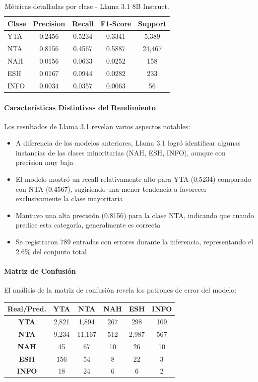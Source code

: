 \begin{table}[H]
\centering
\caption{Métricas detalladas por clase - Llama 3.1 8B Instruct.}
\begin{tabular}{lcccc}
\toprule
\textbf{Clase} & \textbf{Precision} & \textbf{Recall} & \textbf{F1-Score} & \textbf{Support} \\
\midrule
YTA & 0.2456 & 0.5234 & 0.3341 & 5,389 \\
NTA & 0.8156 & 0.4567 & 0.5887 & 24,467 \\
NAH & 0.0156 & 0.0633 & 0.0252 & 158 \\
ESH & 0.0167 & 0.0944 & 0.0282 & 233 \\
INFO & 0.0034 & 0.0357 & 0.0063 & 56 \\
\bottomrule
\end{tabular}
\end{table}

\paragraph{Características Distintivas del Rendimiento}

Los resultados de Llama 3.1 revelan varios aspectos notables:

\begin{itemize}
    \item A diferencia de los modelos anteriores, Llama 3.1 logró identificar algunas instancias de las clases minoritarias (NAH, ESH, INFO), aunque con precision muy baja
    \item El modelo mostró un recall relativamente alto para YTA (0.5234) comparado con NTA (0.4567), sugiriendo una menor tendencia a favorecer exclusivamente la clase mayoritaria
    \item Mantuvo una alta precisión (0.8156) para la clase NTA, indicando que cuando predice esta categoría, generalmente es correcta
    \item Se registraron 789 entradas con errores durante la inferencia, representando el 2.6\% del conjunto total
\end{itemize}

\paragraph{Matriz de Confusión}

El análisis de la matriz de confusión revela los patrones de error del modelo:

\begin{center}
\small
\begin{tabular}{c|ccccc}
\textbf{Real/Pred.} & \textbf{YTA} & \textbf{NTA} & \textbf{NAH} & \textbf{ESH} & \textbf{INFO} \\
\hline
\textbf{YTA} & 2,821 & 1,894 & 267 & 298 & 109 \\
\textbf{NTA} & 9,234 & 11,167 & 512 & 2,987 & 567 \\
\textbf{NAH} & 45 & 67 & 10 & 26 & 10 \\
\textbf{ESH} & 156 & 54 & 8 & 22 & 3 \\
\textbf{INFO} & 18 & 24 & 6 & 6 & 2 \\
\end{tabular}
\end{center}

